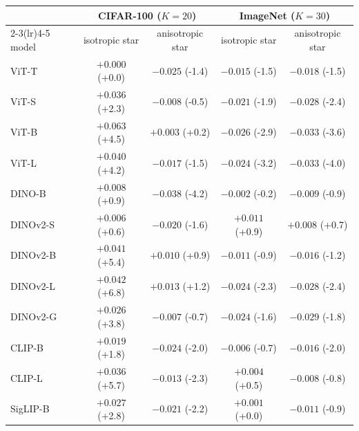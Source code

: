 \begin{table}[H]
\centering
\footnotesize
\setlength{\tabcolsep}{3pt}
\begin{tabular}{lcc@{\hspace{8pt}}cc}
\toprule
 & \multicolumn{2}{c}{CIFAR-100 ($K{=}20$)} & \multicolumn{2}{c}{ImageNet ($K{=}30$)} \\
\cmidrule(lr){2-3}\cmidrule(lr){4-5}
model & isotropic star & anisotropic star & isotropic star & anisotropic star \\
\midrule
ViT-T & $+0.000$ (+0.0) & $-0.025$ (-1.4) & $-0.015$ (-1.5) & $-0.018$ (-1.5) \\
ViT-S & $+0.036$ (+2.3) & $-0.008$ (-0.5) & $-0.021$ (-1.9) & $-0.028$ (-2.4) \\
ViT-B & $+0.063$ (+4.5) & $+0.003$ (+0.2) & $-0.026$ (-2.9) & $-0.033$ (-3.6) \\
ViT-L & $+0.040$ (+4.2) & $-0.017$ (-1.5) & $-0.024$ (-3.2) & $-0.033$ (-4.0) \\
\midrule
DINO-B & $+0.008$ (+0.9) & $-0.038$ (-4.2) & $-0.002$ (-0.2) & $-0.009$ (-0.9) \\
DINOv2-S & $+0.006$ (+0.6) & $-0.020$ (-1.6) & $+0.011$ (+0.9) & $+0.008$ (+0.7) \\
DINOv2-B & $+0.041$ (+5.4) & $+0.010$ (+0.9) & $-0.011$ (-0.9) & $-0.016$ (-1.2) \\
DINOv2-L & $+0.042$ (+6.8) & $+0.013$ (+1.2) & $-0.024$ (-2.3) & $-0.028$ (-2.4) \\
DINOv2-G & $+0.026$ (+3.8) & $-0.007$ (-0.7) & $-0.024$ (-1.6) & $-0.029$ (-1.8) \\
\midrule
CLIP-B & $+0.019$ (+1.8) & $-0.024$ (-2.0) & $-0.006$ (-0.7) & $-0.016$ (-2.0) \\
CLIP-L & $+0.036$ (+5.7) & $-0.013$ (-2.3) & $+0.004$ (+0.5) & $-0.008$ (-0.8) \\
SigLIP-B & $+0.027$ (+2.8) & $-0.021$ (-2.2) & $+0.001$ (+0.0) & $-0.011$ (-0.9) \\
\bottomrule
\end{tabular}

\end{table}
